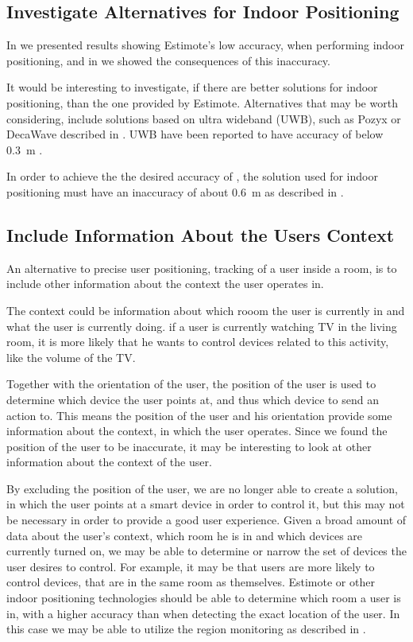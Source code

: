 \subsection{Investigate Alternatives for Indoor Positioning}

In  we presented results showing Estimote's low accuracy, 
when performing indoor positioning, 
and in  we showed the consequences of this inaccuracy.

It would be interesting to investigate, 
if there are better solutions for indoor positioning, 
than the one provided by Estimote.
Alternatives that may be worth considering, 
include solutions based on ultra wideband (UWB), 
such as Pozyx or DecaWave described in .
UWB have been reported to have accuracy of below \SI{0.3}{\meter} \cite{Liu:4343996}.

In order to achieve the the desired accuracy of ,
the solution used for indoor positioning must have an inaccuracy of about \SI{0.6}{\meter}
as described in .

\subsection{Include Information About the Users Context}

An alternative to precise user positioning, 
\ie tracking of a user inside a room, 
is to include other information about the context the user operates in.

The context could be information about which rooom the user is currently in and what the user is currently doing. \eg if a user is currently watching TV in the living room, it is more likely that he wants to control devices related to this activity, like the volume of the TV.

Together with the orientation of the user, 
the position of the user is used to determine which device the user points at, 
and thus which device to send an action to. 
This means the position of the user and his orientation provide some information about the context, 
in which the user operates. 
Since we found the position of the user to be inaccurate, 
it may be interesting to look at other information about the context of the user.

By excluding the position of the user, 
we are no longer able to create a solution, 
in which the user points at a smart device in order to control it, 
but this may not be necessary in order to provide a good user experience. 
Given a broad amount of data about the user's context, 
\eg which room he is in and which devices are currently turned on, 
we may be able to determine or narrow the set of devices the user desires to control. 
For example, it may be that users are more likely to control devices, 
that are in the same room as themselves. 
Estimote or other indoor positioning technologies should be able to determine which room a user is in, 
with a higher accuracy than when detecting the exact location of the user.
In this case we may be able to utilize the region monitoring as described in .

